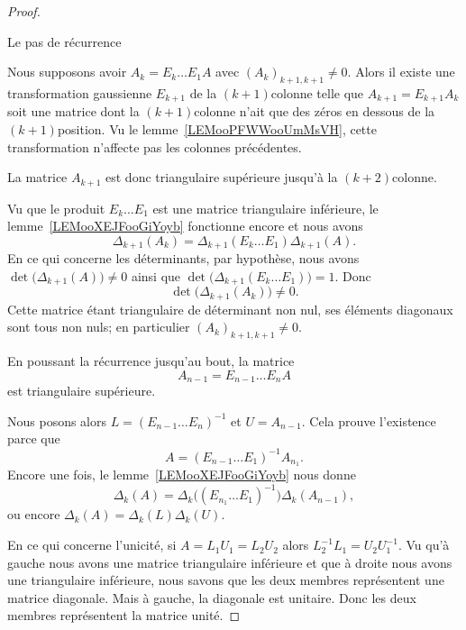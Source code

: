 \begin{proof}
\begin{subproof}
		\item[Le pas de récurrence]

		Nous supposons avoir \( A_k=E_k\ldots E_1A\) avec \( (A_k)_{k+1,k+1}\neq 0\). Alors il existe une transformation gaussienne \( E_{k+1}\) de la \( (k+1)\)\ieme colonne telle que \( A_{k+1}=E_{k+1}A_k\) soit une matrice dont la \( (k+1)\)\ieme colonne n'ait que des zéros en dessous de la \( (k+1)\)\ieme position. Vu le lemme~\ref{LEMooPFWWooUmMsVH}, cette transformation n'affecte pas les colonnes précédentes.

		La matrice \( A_{k+1}\) est donc triangulaire supérieure jusqu'à la \( (k+2)\)\ieme colonne.

		Vu que le produit \( E_k\ldots E_1\) est une matrice triangulaire inférieure, le lemme~\ref{LEMooXEJFooGiYoyb} fonctionne encore et nous avons
		\begin{equation}
			\Delta_{k+1}(A_k)=\Delta_{k+1}(E_k\ldots E_1)\Delta_{k+1}(A).
		\end{equation}
		En ce qui concerne les déterminants, par hypothèse, nous avons \( \det\big( \Delta_{k+1}(A) \big)\neq 0\) ainsi que \( \det\big( \Delta_{k+1}(E_k\ldots E_1) \big)=1\). Donc
		\begin{equation}
			\det\big( \Delta_{k+1}(A_k) \big)\neq 0.
		\end{equation}
		Cette matrice étant triangulaire de déterminant non nul, ses éléments diagonaux sont tous non nuls; en particulier \( (A_k)_{k+1,k+1}\neq 0\).
	\end{subproof}

	En poussant la récurrence jusqu'au bout, la matrice
	\begin{equation}
		A_{n-1}=E_{n-1}\ldots E_nA
	\end{equation}
	est triangulaire supérieure.

	Nous posons alors \(   L=(E_{n-1}\ldots E_n)^{-1}  \) et \( U=A_{n-1}\). Cela prouve l'existence parce que
	\begin{equation}
		A=(E_{n-1}\ldots E_1)^{-1}A_{n_1}.
	\end{equation}
	Encore une fois, le lemme~\ref{LEMooXEJFooGiYoyb} nous donne
	\begin{equation}
		\Delta_k(A)=\Delta_k\Big( (E_{n_1}\ldots E_1)^{-1} \Big)\Delta_k(A_{n-1}),
	\end{equation}
	ou encore \( \Delta_k(A)=\Delta_k(L)\Delta_k(U)\).

	En ce qui concerne l'unicité, si \( A=L_1U_1=L_2U_2\) alors \( L_2^{-1}L_1=U_2U_1^{-1} \). Vu qu'à gauche nous avons une matrice triangulaire inférieure et que à droite nous avons une triangulaire inférieure, nous savons que les deux membres représentent une matrice diagonale. Mais à gauche, la diagonale est unitaire. Donc les deux membres représentent la matrice unité.
\end{proof}

